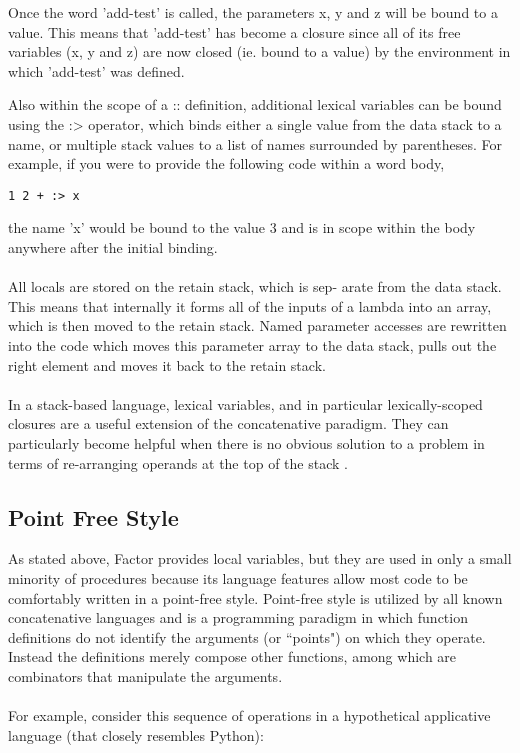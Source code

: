 \documentclass{sig-alternate}
\begin{document}
\cite{LexicalClosures} Once the word 'add-test' is called, the parameters x, y and z will be bound to a value.  This means that 'add-test' has become a closure since all of its free variables (x, y and z) are now closed (ie. bound to a value) by the environment in which 'add-test' was defined.   

Also within the scope of a :: definition, additional lexical variables can be bound using the :> operator, which binds either a single value from the data stack to a name, or multiple stack values to a list of names surrounded by parentheses.\cite{DataflowComibinators} For example, if you were to provide the following code within a word body,

\begin{verbatim}
1 2 + :> x
\end{verbatim}

\cite{LexicalClosures} the name 'x' would be bound to the value 3 and is in scope within the body anywhere after the initial binding.
\\\\
All locals are stored on the retain stack, which is sep-
arate from the data stack. This means that internally it forms all of the inputs of a lambda into an array, which is then moved to the retain stack. Named parameter accesses are rewritten into the code which moves this parameter array to the data stack, pulls out the right element and moves it back to the retain stack.\cite{Closures} 
\\\\
In a stack-based language, lexical variables, and in particular lexically-scoped closures are a useful extension of the concatenative paradigm.  They can particularly become helpful when there is no obvious solution to a problem in terms of re-arranging operands at the top of the stack \cite{FactorArticle}. 

\subsection{Point Free Style}

As stated above, Factor provides local variables, but they are used in only a small minority of procedures because its language features allow most code to be comfortably written in a point-free style.  Point-free style is utilized by all known concatenative languages and is a programming paradigm in which function definitions do not identify the arguments (or ``points") on which they operate. Instead the definitions merely compose other functions, among which are combinators that manipulate the arguments.\cite{TacticProgramming}
\\\\
For example, consider this sequence of operations in a hypothetical applicative language (that closely resembles Python):
\end{document}
